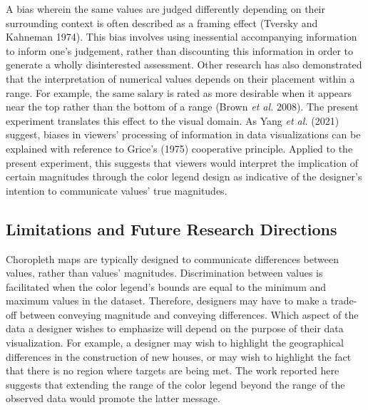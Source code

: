 \documentclass[
]{interact}
\begin{document}
A bias wherein the same values are judged differently depending on their
surrounding context is often described as a framing effect (Tversky and
Kahneman 1974). This bias involves using inessential accompanying
information to inform one's judgement, rather than discounting this
information in order to generate a wholly disinterested assessment.
Other research has also demonstrated that the interpretation of
numerical values depends on their placement within a range. For example,
the same salary is rated as more desirable when it appears near the top
rather than the bottom of a range (Brown \emph{et al.} 2008). The
present experiment translates this effect to the visual domain. As Yang
\emph{et al.} (2021) suggest, biases in viewers' processing of
information in data visualizations can be explained with reference to
Grice's (1975) cooperative principle. Applied to the present experiment,
this suggests that viewers would interpret the implication of certain
magnitudes through the color legend design as indicative of the
designer's intention to communicate values' true magnitudes.

\hypertarget{limitations-and-future-research-directions}{%
\subsection{Limitations and Future Research
Directions}\label{limitations-and-future-research-directions}}

Choropleth maps are typically designed to communicate differences
between values, rather than values' magnitudes. Discrimination between
values is facilitated when the color legend's bounds are equal to the
minimum and maximum values in the dataset. Therefore, designers may have
to make a trade-off between conveying magnitude and conveying
differences. Which aspect of the data a designer wishes to emphasize
will depend on the purpose of their data visualization. For example, a
designer may wish to highlight the geographical differences in the
construction of new houses, or may wish to highlight the fact that there
is no region where targets are being met. The work reported here
suggests that extending the range of the color legend beyond the range
of the observed data would promote the latter message.
\end{document}
